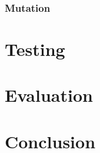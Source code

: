 \documentclass[a4paper, 12pt]{report}
\begin{document}
\subsection{Mutation}

\chapter{Testing}

\chapter{Evaluation}

\chapter{Conclusion}

%

%
\end{document}
